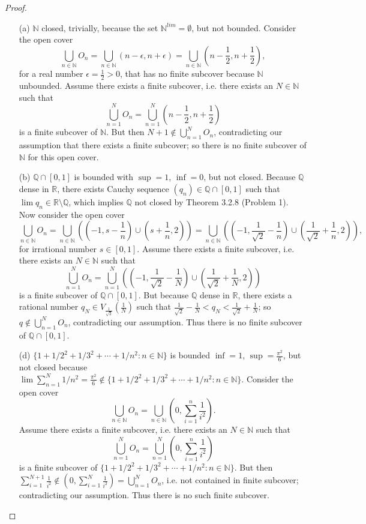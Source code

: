 \documentclass[11pt,twoside, reqno]{amsart}
\theoremstyle{remark}
\def\R{\mathbb R}
\def\Q{\mathbb Q}
\def\N{\mathbb N}
\begin{document}
\begin{proof}
\begin{enumerate}
    \item [(a)] $\N$ closed, trivially, because the set $\N^{lim} = \emptyset$, but not bounded. Consider the open cover
    $$
        \bigcup_{n \in \N} O_n = \bigcup_{n \in \N} (n-\epsilon, n+\epsilon) = \bigcup_{n \in \N} (n-\frac{1}{2}, n+\frac{1}{2}),
    $$
    for a real number $\epsilon = \frac{1}{2} > 0$, that has no finite subcover because $\N$ unbounded. Assume there exists a finite subcover, i.e. there exists an $N \in \N$ such that
    $$
        \bigcup^N_{n=1} O_n = \bigcup^N_{n=1} (n-\frac{1}{2}, n+\frac{1}{2})
    $$
    is a finite subcover of $\N$. But then $N+1 \not \in \bigcup^N_{n=1} O_n$, contradicting our assumption that there exists a finite subcover; so there is no finite subcover of $\N$ for this open cover.
    \item [(b)] $\Q \cap [0,1]$ is bounded with $\sup = 1$, $\inf = 0$, but not closed. Because $\Q$ dense in $\R$, there exists Cauchy sequence $(q_n) \in \Q \cap [0,1]$ such that $\lim q_n \in \R \setminus \Q$, which implies $\Q$ not closed by Theorem 3.2.8 (Problem 1). Now consider the open cover
    $$
        \bigcup_{n \in \N} O_n = \bigcup_{n \in \N} ((-1,s-\frac{1}{n}) \cup (s+\frac{1}{n},2)) = \bigcup_{n \in \N} ((-1,\frac{1}{\sqrt{2}}-\frac{1}{n}) \cup (\frac{1}{\sqrt{2}}+\frac{1}{n},2)),
    $$
    for irrational number $s \in [0,1]$. Assume there exists a finite subcover, i.e. there exists an $N \in \N$ such that
    $$
        \bigcup^N_{n=1} O_n = \bigcup^N_{n=1} ((-1,\frac{1}{\sqrt{2}}-\frac{1}{N}) \cup (\frac{1}{\sqrt{2}}+\frac{1}{N},2))
    $$
    is a finite subcover of $\Q \cap [0,1]$. But because $\Q$ dense in $\R$, there exists a rational number $q_N \in V_\frac{1}{\sqrt{2}}(\frac{1}{N})$ such that $\frac{1}{\sqrt{2}}-\frac{1}{N}< q_N < \frac{1}{\sqrt{2}}+\frac{1}{N}$; so $q \not \in \bigcup^N_{n=1} O_n$, contradicting our assumption. Thus there is no finite subcover of $\Q \cap [0,1]$.
    \item [(d)] $\{1 + 1/2^2 + 1/3^2 + \cdots + 1/n^2 : n \in \N\}$ is bounded $\inf = 1$, $\sup = \frac{\pi^2}{6}$, but not closed because $\lim \sum^N_{n=1}1/n^2 = \frac{\pi^2}{6} \not \in \{1 + 1/2^2 + 1/3^2 + \cdots + 1/n^2 : n \in \N\}$. Consider the open cover
    $$
        \bigcup_{n \in \N} O_n = \bigcup_{n \in \N} (0, \sum^n_{i=1}\frac{1}{i^2}).
    $$
    Assume there exists a finite subcover, i.e. there exists an $N \in \N$ such that
    $$
        \bigcup^N_{n=1} O_n = \bigcup^N_{n=1} (0, \sum^n_{i=1}\frac{1}{i^2})
    $$
    is a finite subcover of $\{1 + 1/2^2 + 1/3^2 + \cdots + 1/n^2 : n \in \N\}$. But then $\sum^{N+1}_{i=1}\frac{1}{i^2} \not \in (0, \sum^{N}_{i=1}\frac{1}{i^2}) = \bigcup^N_{n=1} O_n$, i.e. not contained in finite subcover; contradicting our assumption. Thus there is no such finite subcover.
\end{enumerate}

\end{proof}
\end{document}
